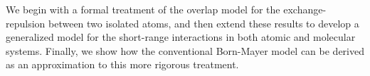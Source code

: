 



We begin with a formal treatment of the overlap model for the
exchange-repulsion between two isolated atoms, and then extend 
these results to develop a generalized model for the short-range 
interactions in both atomic and molecular systems. 
Finally, we show how the conventional Born-Mayer model can be derived as an
approximation to this more rigorous treatment.

